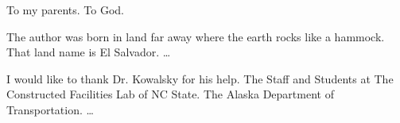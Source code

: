 \begin{abstract}

\lipsum[1-6]


\end{abstract}


\makecopyrightpage

\maketitlepage

\begin{dedication}
 \centering To my parents. To God.
\end{dedication}

\begin{biography}
The author was born in land far away where the earth rocks like a hammock. That land name is El Salvador. \ldots
\end{biography}

\begin{acknowledgements}
I would like to thank Dr. Kowalsky for his help. The Staff and Students at The Constructed Facilities Lab of NC State. The Alaska Department of Transportation. \ldots
\end{acknowledgements}


\thesistableofcontents

\thesislistoftables

\thesislistoffigures
